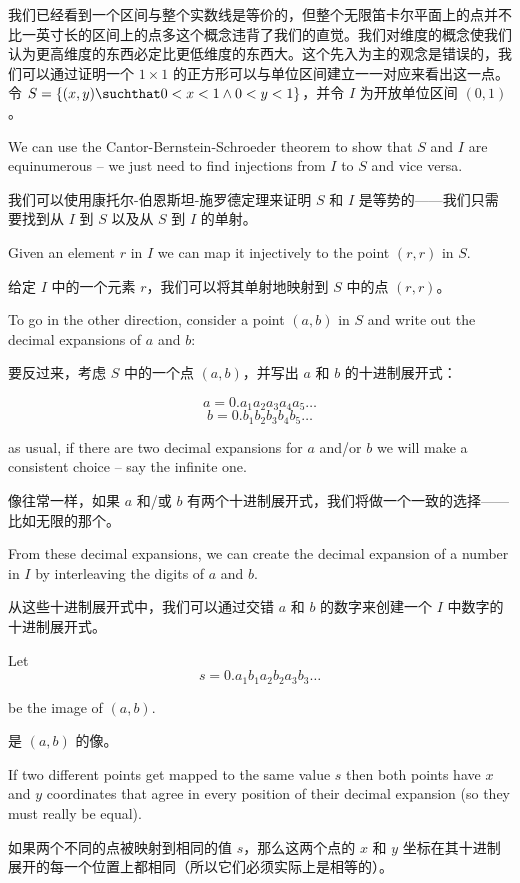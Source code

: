 我们已经看到一个区间与整个实数线是等价的，但整个无限笛卡尔平面上的点并不比一英寸长的区间上的点多这个概念违背了我们的直觉。我们对维度的概念使我们认为更高维度的东西必定比更低维度的东西大。这个先入为主的观念是错误的，我们可以通过证明一个 $1 \times 1$ 的正方形可以与单位区间建立一一对应来看出这一点。令 $S = \{ (x, y) \suchthat 0 < x < 1 \land 0 < y < 1 \}$，并令 $I$ 为开放单位区间 $(0, 1)$。

We can use the Cantor-Bernstein-Schroeder
theorem to show that $S$ and $I$ are equinumerous -- we just need to find
injections from $I$ to $S$ and vice versa.

我们可以使用康托尔-伯恩斯坦-施罗德定理来证明 $S$ 和 $I$ 是等势的——我们只需要找到从 $I$ 到 $S$ 以及从 $S$ 到 $I$ 的单射。

Given an element $r$ in $I$ we
can map it injectively to the point $(r, r)$ in $S$.

给定 $I$ 中的一个元素 $r$，我们可以将其单射地映射到 $S$ 中的点 $(r, r)$。

To go in the other
direction, consider a point $(a, b)$ in $S$
and write out the decimal expansions of $a$ and $b$:

要反过来，考虑 $S$ 中的一个点 $(a, b)$，并写出 $a$ 和 $b$ 的十进制展开式：

\[ a = 0.a_1a_2a_3a_4a_5\ldots \]
\[ b = 0.b_1b_2b_3b_4b_5\ldots \]

\noindent as usual, if there are two decimal expansions for $a$ and/or $b$ we
will make a consistent choice -- say the infinite one.

\noindent 像往常一样，如果 $a$ 和/或 $b$ 有两个十进制展开式，我们将做一个一致的选择——比如无限的那个。

From these decimal expansions, we can create the decimal expansion of
a number in $I$ by interleaving the digits of $a$ and $b$.

从这些十进制展开式中，我们可以通过交错 $a$ 和 $b$ 的数字来创建一个 $I$ 中数字的十进制展开式。

Let
\[ s = 0.a_1b_1a_2b_2a_3b_3 \ldots \]

\noindent be the image of $(a, b)$.

\noindent 是 $(a, b)$ 的像。

If two different points get mapped to the same
value $s$ then both points have $x$ and $y$ coordinates that agree in
every position of
their decimal expansion (so they must really be equal).

如果两个不同的点被映射到相同的值 $s$，那么这两个点的 $x$ 和 $y$ 坐标在其十进制展开的每一个位置上都相同（所以它们必须实际上是相等的）。

